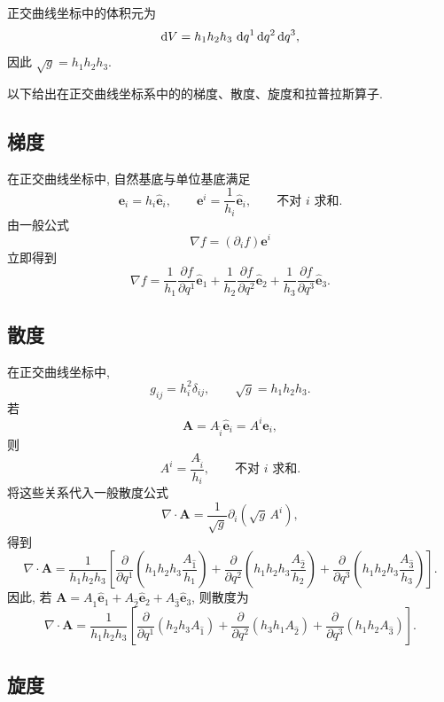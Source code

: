 正交曲线坐标中的体积元为
\[
\mathop{}\!\mathrm{d} V = h_{1}h_{2}h_{3}\,\mathop{}\!\mathrm{d} q^{1}\mathop{}\!\mathrm{d} q^{2}\mathop{}\!\mathrm{d} q^{3},
\]
因此 $\sqrt{g}=h_{1}h_{2}h_{3}$. 


以下给出在正交曲线坐标系中的的梯度、散度、旋度和拉普拉斯算子. 
\subsection{梯度}

在正交曲线坐标中, 自然基底与单位基底满足
\[
\bm{e}_{i}=h_{i}\hat{\bm{e}}_{i},
\qquad
\bm{e}^{i}=\frac{1}{h_{i}}\hat{\bm{e}}_{i},
\qquad \text{不对 } i \text{ 求和}.
\]
由一般公式
\[
\nabla f=(\partial_{i}f)\bm{e}^{i}
\]
立即得到
\begin{equation}
	\nabla f
	=
	\frac{1}{h_{1}}\frac{\partial f}{\partial q^{1}}\hat{\bm{e}}_{1}
	+
	\frac{1}{h_{2}}\frac{\partial f}{\partial q^{2}}\hat{\bm{e}}_{2}
	+
	\frac{1}{h_{3}}\frac{\partial f}{\partial q^{3}}\hat{\bm{e}}_{3}. \label{eq:1.16}
\end{equation}

\subsection{散度}

在正交曲线坐标中, 
\[
g_{ij}=h_{i}^{2}\delta_{ij},
\qquad
\sqrt{g}=h_{1}h_{2}h_{3}.
\]
若
\[
\bm{A}
=
A_{\hat{i}}\hat{\bm{e}}_{i}
=
A^{i}\bm{e}_{i},
\]
则
\[
A^{i}
=
\frac{A_{\hat{i}}}{h_{i}},
\qquad \text{不对 } i \text{ 求和}.
\]
将这些关系代入一般散度公式
\[
\nabla\cdot\bm{A}
=
\frac{1}{\sqrt{g}}\partial_{i}(\sqrt{g}\,A^{i}),
\]
得到
\[
\nabla\cdot\bm{A}
=
\frac{1}{h_{1}h_{2}h_{3}}
\left[
\frac{\partial}{\partial q^{1}}
\left(
h_{1}h_{2}h_{3}\frac{A_{\hat{1}}}{h_{1}}
\right)
+
\frac{\partial}{\partial q^{2}}
\left(
h_{1}h_{2}h_{3}\frac{A_{\hat{2}}}{h_{2}}
\right)
+
\frac{\partial}{\partial q^{3}}
\left(
h_{1}h_{2}h_{3}\frac{A_{\hat{3}}}{h_{3}}
\right)
\right].
\]
因此, 若 $\bm{A} = A_{\hat{1}}\hat{\bm{e}}_{1} + A_{\hat{2}}\hat{\bm{e}}_{2} + A_{\hat{3}}\hat{\bm{e}}_{3}$, 则散度为
\begin{equation}
	\nabla\cdot\bm{A}
	=
	\frac{1}{h_{1}h_{2}h_{3}}
	\left[
	\frac{\partial}{\partial q^{1}}(h_{2}h_{3}A_{\hat{1}})
	+
	\frac{\partial}{\partial q^{2}}(h_{3}h_{1}A_{\hat{2}})
	+
	\frac{\partial}{\partial q^{3}}(h_{1}h_{2}A_{\hat{3}})
	\right]. \label{eq:1.17}
\end{equation}

\subsection{旋度}

